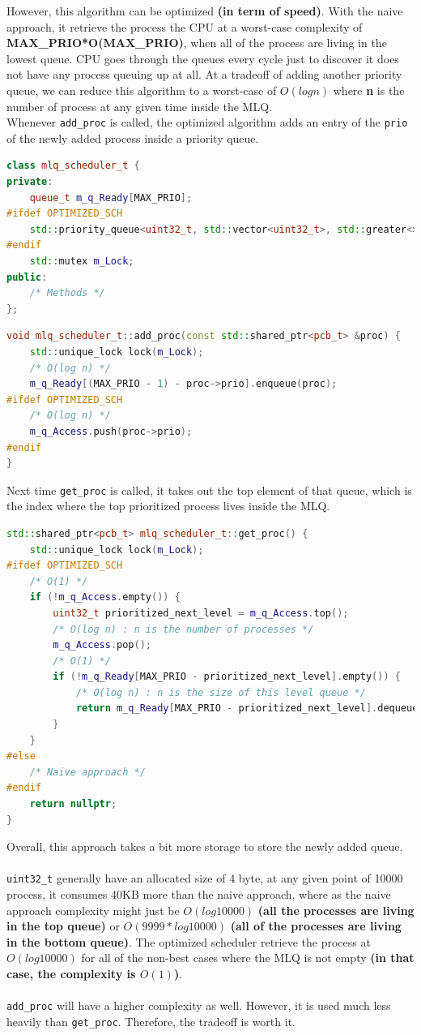 \documentclass[]{article}
\begin{document}
However, this algorithm can be optimized \textbf{(in term of speed)}. With the naive approach, it retrieve the process the CPU at a worst-case complexity of \textbf{MAX\_PRIO*O(MAX\_PRIO)}, when all of the process are living in the lowest queue. CPU goes through the queues every cycle just to discover it does not have any process queuing up at all.
At a tradeoff of adding another priority queue, we can reduce this algorithm to a worst-case of $O(log n)$ where \textbf{n} is the number of process at any given time inside the MLQ.
\\
Whenever \lstinline|add_proc| is called, the optimized algorithm adds an entry of the \lstinline|prio| of the newly added process inside a priority queue.
\begin{lstlisting}[language=C++]
class mlq_scheduler_t {
private:
	queue_t m_q_Ready[MAX_PRIO];
#ifdef OPTIMIZED_SCH
	std::priority_queue<uint32_t, std::vector<uint32_t>, std::greater<>> m_q_Access;
#endif
	std::mutex m_Lock;
public:
	/* Methods */
};
\end{lstlisting}
\begin{lstlisting}[language=C++]
void mlq_scheduler_t::add_proc(const std::shared_ptr<pcb_t> &proc) {
	std::unique_lock lock(m_Lock);
	/* O(log n) */
	m_q_Ready[(MAX_PRIO - 1) - proc->prio].enqueue(proc);
#ifdef OPTIMIZED_SCH
	/* O(log n) */
	m_q_Access.push(proc->prio);
#endif
}
\end{lstlisting}
Next time \lstinline|get_proc| is called, it takes out the top element of that queue, which is the index where the top prioritized process lives inside the MLQ.
\begin{lstlisting}[language=C++]
std::shared_ptr<pcb_t> mlq_scheduler_t::get_proc() {
	std::unique_lock lock(m_Lock);
#ifdef OPTIMIZED_SCH
	/* O(1) */
	if (!m_q_Access.empty()) {
		uint32_t prioritized_next_level = m_q_Access.top();
		/* O(log n) : n is the number of processes */
		m_q_Access.pop();
		/* O(1) */
		if (!m_q_Ready[MAX_PRIO - prioritized_next_level].empty()) {
			/* O(log n) : n is the size of this level queue */
			return m_q_Ready[MAX_PRIO - prioritized_next_level].dequeue();
		}
	}
#else
	/* Naive approach */	
#endif
	return nullptr;
}
\end{lstlisting}
Overall, this approach takes a bit more storage to store the newly added queue.\\
\\
\lstinline|uint32_t| generally have an allocated size of 4 byte, at any given point of 10000 process, it consumes 40KB more than the naive approach, where as the naive approach complexity might just be $O(log 10000)$ \textbf{(all the processes are living in the top queue)} or $O(9999*log 10000)$ \textbf{(all of the processes are living in the bottom queue)}. The optimized scheduler retrieve the process at $O(log 10000)$ for all of the non-best cases where the MLQ is not empty \textbf{(in that case, the complexity is $O(1)$)}.\\
\\
\lstinline|add_proc| will have a higher complexity as well. However, it is used much less heavily than \lstinline|get_proc|. Therefore, the tradeoff is worth it.
\end{document}
